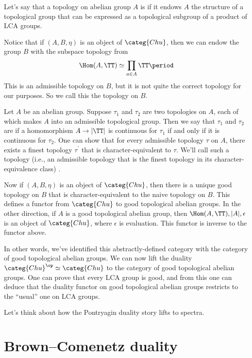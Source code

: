 \documentclass[leqno]{article}
\begin{document}
Let's say that a topology on abelian group \(A\) is 
if it endows \(A\) the structure of a topological group that
can be expressed as a topological subgroup
of a product of LCA groups.

Notice that if \((A,B,\eta)\) is an object of \(\categ{Chu}\), then
we can endow the group \(B\) with the subspace topology from
\begin{equation*}
    \Hom(A,\TT) \simeq \prod_{a \in A} \TT \period
\end{equation*}
This is an admissible topology on \(B\), but
it is not quite the correct topology for our purposes.
So we call this the  topology on \(B\).

Let \(A\) be an abelian group.
Suppose \(\tau_{1}\) and \(\tau_{2}\) are two topologies on \(A\),
each of which makes \(A\) into an admissible topological group.
Then we say that \(\tau_{1}\) and \(\tau_{2}\) are  if
a homomorphism \(A \to |\TT|\) is continuous for \(\tau_{1}\)
if and only if it is continuous for \(\tau_{2}\).
One can show that for every admissible topology \(\tau\) on \(A\),
there exists a finest topology \(\tau^{'}\)
that is character-equivalent to \(\tau\).
We'll call such a topology (i.e., an admissible topology that
is the finest topology in its character-equivalence class)
.

Now if \((A,B,\eta)\) is an object of \(\categ{Chu}\), then
there is a unique good topology on \(B\) that is character-equivalent
to the naive topology on \(B\).
This defines a functor from \(\categ{Chu}\)
to good topological abelian groups.
In the other direction, if \(A\) is a good topological abelian group,
then \(\Hom(A,\TT),|A|,\epsilon\) is an object of \(\categ{Chu}\),
where \(\epsilon\) is evaluation.
This functor is inverse to the functor above.

In other words, we've identified this abstractly-defined category
with the category of good topological abelian groups.
We can now lift the duality \(\categ{Chu}^{\op} \simeq \categ{Chu}\)
to the category of good topological abelian groups.
One can prove that every LCA group is good, and
from this one can deduce that the duality functor
on good topological abelian groups restricts
to the \enquote{usual} one on LCA groups.

Let's think about how the Pontryagin duality story lifts to spectra.

\section{Brown--Comenetz duality}%
\label{browncomenetz}
\end{document}
